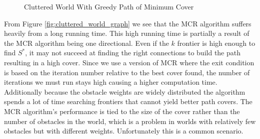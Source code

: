 \begin{figure}[!h]
    \hfill
    \caption{Cluttered World With Greedy Path of Minimum Cover}
    \label{fig:cluttered_world}
\end{figure}



From Figure \ref{fig:cluttered_world_graph} we see that the MCR algorithm suffers heavily from a long running time. This high running time is partially a result of the MCR algorithm being one directional. Even if the $k$ frontier is high enough to find $S^*$, it may not succeed at finding the right connections to build the path resulting in a high cover. Since we use a version of MCR where the exit condition is based on the iteration number relative to the best cover found, the number of iterations we must run stays high causing a higher computation time. Additionally because the obstacle weights are widely distributed the algorithm spends a lot of time searching frontiers that cannot yield better path covers. The MCR algorithm's performance is tied to the size of the cover rather than the number of obstacles in the world, which is a problem in worlds with relatively few obstacles but with different weights. Unfortunately this is a common scenario.

